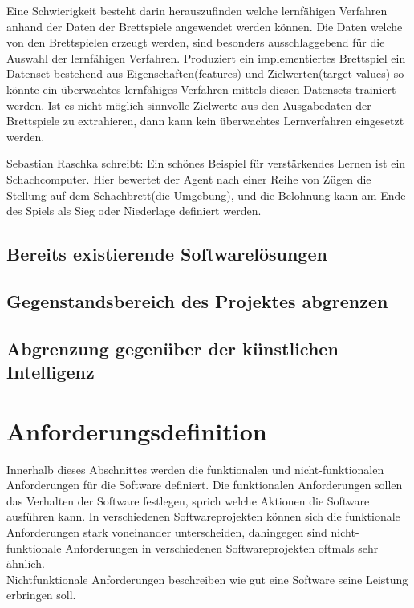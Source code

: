 Eine Schwierigkeit besteht darin herauszufinden welche lernfähigen Verfahren anhand der Daten der Brettspiele angewendet werden können. Die Daten welche von den Brettspielen erzeugt werden, sind besonders ausschlaggebend für die Auswahl der lernfähigen Verfahren. Produziert ein implementiertes Brettspiel ein Datenset bestehend aus Eigenschaften(features) und Zielwerten(target values) so könnte ein überwachtes lernfähiges Verfahren mittels diesen Datensets trainiert werden. Ist es nicht möglich sinnvolle Zielwerte aus den Ausgabedaten der Brettspiele zu extrahieren, dann kann kein überwachtes Lernverfahren eingesetzt werden. 



Sebastian Raschka schreibt: Ein schönes Beispiel für verstärkendes Lernen ist ein Schachcomputer. Hier bewertet der Agent nach einer Reihe von Zügen die Stellung auf dem Schachbrett(die Umgebung), und die Belohnung kann am Ende des Spiels als Sieg oder Niederlage definiert werden.\cite[27]{Raschka}
\subsection{Bereits existierende Softwarelösungen}

\subsection{Gegenstandsbereich des Projektes abgrenzen}

\subsection{Abgrenzung gegenüber der künstlichen Intelligenz}

\section{Anforderungsdefinition}
\label{sec:anforderungsdefinition}
Innerhalb dieses Abschnittes werden die funktionalen und nicht-funktionalen Anforderungen für die Software definiert. Die funktionalen Anforderungen sollen das Verhalten der Software festlegen, sprich welche Aktionen die Software ausführen kann. In verschiedenen Softwareprojekten können sich die funktionale Anforderungen stark voneinander unterscheiden, dahingegen sind nicht-funktionale Anforderungen in verschiedenen Softwareprojekten oftmals sehr ähnlich.\\ 
Nichtfunktionale Anforderungen beschreiben wie gut eine Software seine Leistung erbringen soll.

